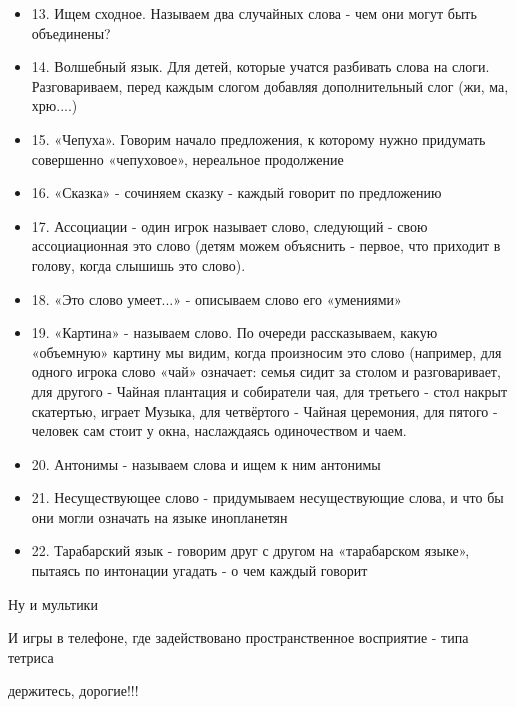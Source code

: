 \begin{itemize}
  \item 13. Ищем сходное. Называем два случайных слова - чем они могут быть объединены?
  \item 14. Волшебный язык. Для детей, которые учатся разбивать слова на слоги. Разговариваем, перед каждым слогом добавляя дополнительный слог (жи, ма, хрю....)
  \item 15. «Чепуха». Говорим начало предложения, к которому нужно придумать совершенно «чепуховое», нереальное продолжение
  \item 16. «Сказка» - сочиняем сказку - каждый говорит по предложению
  \item 17. Ассоциации - один игрок называет слово, следующий - свою ассоциационная это слово (детям можем объяснить - первое, что приходит в голову, когда слышишь это слово).
  \item 18. «Это слово умеет...» - описываем слово его «умениями»
  \item 19. «Картина» - называем слово. По очереди рассказываем, какую «объемную» картину мы видим, когда произносим это слово (например, для одного игрока слово «чай» означает: семья сидит за столом и разговаривает, для другого - Чайная плантация и собиратели чая, для третьего - стол накрыт скатертью, играет Музыка, для четвёртого - Чайная церемония, для пятого - человек сам стоит у окна, наслаждаясь одиночеством и чаем.
  \item 20. Антонимы - называем слова и ищем к ним антонимы
  \item 21. Несуществующее слово - придумываем несуществующие слова, и что бы они могли означать на языке инопланетян
  \item 22. Тарабарский язык - говорим друг с другом на «тарабарском языке», пытаясь по интонации угадать - о чем каждый говорит
\end{itemize}

Ну и мультики

И игры в телефоне, где задействовано пространственное восприятие - типа тетриса

держитесь, дорогие!!! 

